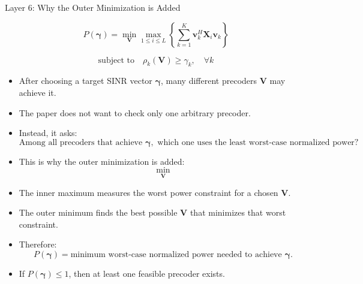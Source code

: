 \documentclass{beamer}
\begin{document}
\begin{frame}{Layer 6: Why the Outer Minimization is Added}
\scriptsize

\[
P(\boldsymbol{\gamma})
=
\min_{\mathbf{V}}
\max_{1\le i\le L}
\left\{
\sum_{k=1}^{K}\mathbf{v}_k^H\mathbf{X}_i\mathbf{v}_k
\right\}
\]

\[
\text{subject to}
\quad
\rho_k(\mathbf{V})\ge \gamma_k,
\quad \forall k
\]

\begin{itemize}
    \item After choosing a target SINR vector \(\boldsymbol{\gamma}\), many different precoders \(\mathbf{V}\) may achieve it.

    \item The paper does not want to check only one arbitrary precoder.

    \item Instead, it asks:
    \[
        \text{Among all precoders that achieve } \boldsymbol{\gamma},
        \text{ which one uses the least worst-case normalized power?}
    \]

    \item This is why the outer minimization is added:
    \[
        \min_{\mathbf{V}}
    \]

    \item The inner maximum measures the worst power constraint for a chosen \(\mathbf{V}\).

    \item The outer minimum finds the best possible \(\mathbf{V}\) that minimizes that worst constraint.

    \item Therefore:
    \[
        P(\boldsymbol{\gamma})
        =
        \text{minimum worst-case normalized power needed to achieve }
        \boldsymbol{\gamma}.
    \]

    \item If \(P(\boldsymbol{\gamma})\le 1\), then at least one feasible precoder exists.
\end{itemize}

\end{frame}
\end{document}
